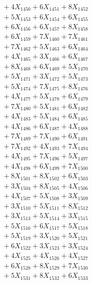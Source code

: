 \documentclass[a4paper,10pt]{article}
\begin{document}
{\begin{align}
&\;  + 4 X_{1450} + 6 X_{1451} + 8 X_{1452} \\[0.3ex]
&\;  + 5 X_{1453} + 6 X_{1454} + 6 X_{1455} \\[0.3ex]
&\;  + 6 X_{1456} + 6 X_{1457} + 8 X_{1458} \\[0.3ex]
&\;  + 6 X_{1459} + 7 X_{1460} + 7 X_{1461} \\[0.3ex]
&\;  + 7 X_{1462} + 5 X_{1463} + 6 X_{1464} \\[0.3ex]
&\;  + 4 X_{1465} + 3 X_{1466} + 6 X_{1467} \\[0.3ex]
&\;  + 8 X_{1468} + 6 X_{1469} + 5 X_{1470} \\[0.3ex]
&\;  + 5 X_{1471} + 3 X_{1472} + 5 X_{1473} \\[0.3ex]
&\;  + 5 X_{1474} + 7 X_{1475} + 8 X_{1476} \\[0.3ex]
&\;  + 4 X_{1477} + 5 X_{1478} + 6 X_{1479} \\[0.5ex]\allowbreak
&\;  + 7 X_{1480} + 5 X_{1481} + 6 X_{1482} \\[0.3ex]
&\;  + 4 X_{1483} + 5 X_{1484} + 6 X_{1485} \\[0.3ex]
&\;  + 4 X_{1486} + 6 X_{1487} + 4 X_{1488} \\[0.3ex]
&\;  + 7 X_{1489} + 7 X_{1490} + 6 X_{1491} \\[0.3ex]
&\;  + 7 X_{1492} + 4 X_{1493} + 7 X_{1494} \\[0.3ex]
&\;  + 4 X_{1495} + 7 X_{1496} + 5 X_{1497} \\[0.3ex]
&\;  + 4 X_{1498} + 6 X_{1499} + 7 X_{1500} \\[0.3ex]
&\;  + 8 X_{1501} + 8 X_{1502} + 6 X_{1503} \\[0.3ex]
&\;  + 3 X_{1504} + 8 X_{1505} + 4 X_{1506} \\[0.3ex]
&\;  + 4 X_{1507} + 5 X_{1508} + 3 X_{1509} \\[0.5ex]\allowbreak
&\;  + 3 X_{1510} + 5 X_{1511} + 8 X_{1512} \\[0.3ex]
&\;  + 3 X_{1513} + 5 X_{1514} + 3 X_{1515} \\[0.3ex]
&\;  + 5 X_{1516} + 6 X_{1517} + 5 X_{1518} \\[0.3ex]
&\;  + 5 X_{1519} + 3 X_{1520} + 5 X_{1521} \\[0.3ex]
&\;  + 6 X_{1522} + 3 X_{1523} + 3 X_{1524} \\[0.3ex]
&\;  + 4 X_{1525} + 4 X_{1526} + 4 X_{1527} \\[0.3ex]
&\;  + 6 X_{1528} + 8 X_{1529} + 7 X_{1530} \\[0.3ex]
&\;  + 5 X_{1531} + 8 X_{1532} + 6 X_{1533} \\[0.3ex]

\end{align}}
\end{document}
